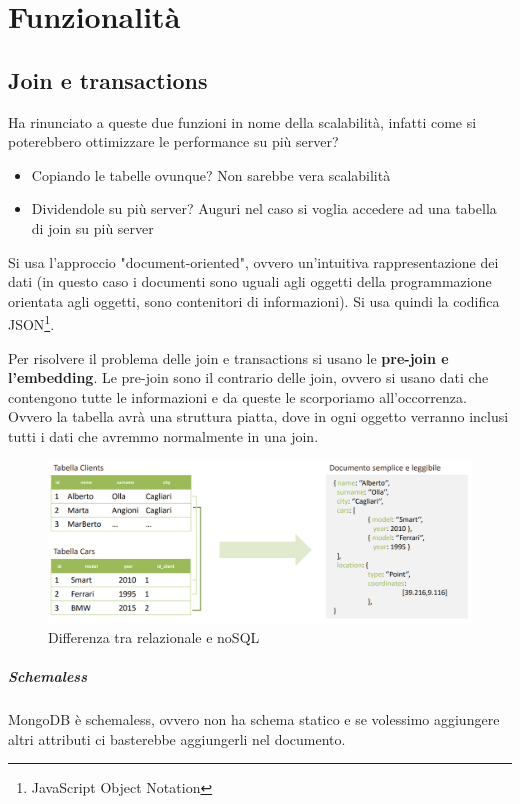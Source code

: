 \documentclass[11pt,a4paper]{book}
\begin{document}
\chapter{Funzionalità}
\section{Join e transactions}
Ha rinunciato a queste due funzioni in nome della scalabilità, infatti come si poterebbero ottimizzare le performance su più server?
\begin{itemize}
	\item[] Copiando le tabelle ovunque? Non sarebbe vera scalabilità
	\item[] Dividendole su più server? Auguri nel caso si voglia accedere ad una tabella di join su più server
\end{itemize}
Si usa l'approccio "document-oriented", ovvero un'intuitiva rappresentazione dei dati (in questo caso i documenti sono uguali agli oggetti della programmazione orientata agli oggetti, sono contenitori di informazioni). Si usa quindi la codifica JSON\footnote{JavaScript Object Notation}.

Per risolvere il problema delle join e transactions si usano le \textbf{pre-join e l'embedding}. Le pre-join sono il contrario delle join, ovvero si usano dati che contengono tutte le informazioni e da queste le scorporiamo all'occorrenza. Ovvero la tabella avrà una struttura piatta, dove in ogni oggetto verranno inclusi tutti i dati che avremmo normalmente in una join.
\begin{figure}[h!]
	\begin{center}
		\includegraphics[scale=0.6]{img/008.png}
		\caption{Differenza tra relazionale e noSQL}
		\label{fig: 008}
	\end{center}
\end{figure}

\paragraph{Schemaless} 
MongoDB è schemaless, ovvero non ha schema statico e se volessimo aggiungere altri attributi ci basterebbe aggiungerli nel documento.
\end{document}
